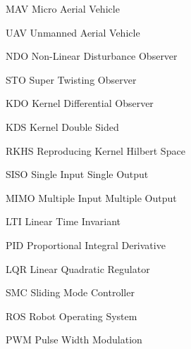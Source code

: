 \documentclass[letterpaper%
, twoside%
, 12pt%
,memoire%
, english%
,creativecommons,hyperref%
]{thETS}
\theoremstyle{newThmStyle}
\begin{document}
\tableofcontents

\listoftables

\listoffigures

\begin{listofabbr}[3cm]
\item[MAV]    Micro Aerial Vehicle
\item[UAV]    Unmanned Aerial Vehicle
\item[NDO]    Non-Linear Disturbance Observer
\item[STO]    Super Twisting Observer
\item[KDO]    Kernel Differential Observer
\item[KDS]    Kernel Double Sided
\item[RKHS]   Reproducing Kernel Hilbert Space
\item[SISO]   Single Input Single Output
\item[MIMO]   Multiple Input Multiple Output
\item[LTI]    Linear Time Invariant
\item[PID]    Proportional Integral Derivative 
\item[LQR]    Linear Quadratic Regulator
\item[SMC]    Sliding Mode Controller
\item[ROS]    Robot Operating System
\item[PWM]    Pulse Width Modulation

\end{listofabbr}
\end{document}
